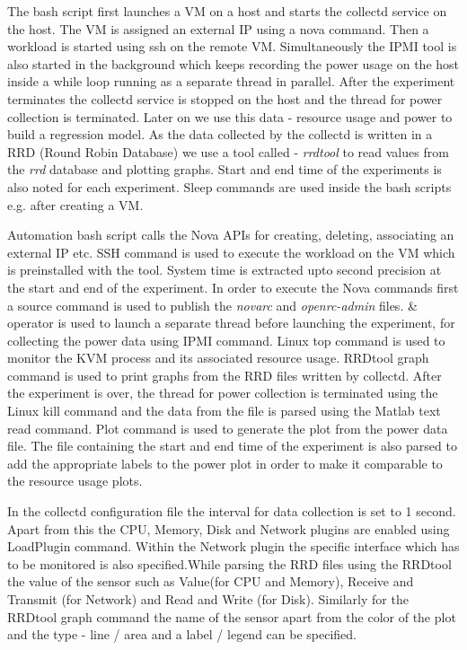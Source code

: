 \documentclass[singlecolumn,letterpaper,12pt]{article}
\begin{document}
The bash script first launches a VM on a host and starts the collectd service on the host. The VM is assigned an external IP using a nova command. Then a workload is started using ssh on the remote VM. Simultaneously the IPMI tool is also started in the background which keeps recording the power usage on the host inside a while loop running as a separate thread in parallel. After the experiment terminates the collectd service is stopped on the host and the thread for power collection is terminated. Later on we use this data - resource usage and power to build a regression model. As the data collected by the collectd is written in a RRD (Round Robin Database) we use a tool called - \emph{rrdtool} to read values from the \emph{rrd} database and plotting graphs. Start and end time of the experiments is also noted for each experiment. Sleep commands are used inside the bash scripts e.g. after creating a VM.

Automation bash script calls the Nova APIs for creating, deleting, associating an external IP etc. SSH command is used to execute the workload on the VM which is preinstalled with the tool. System time is extracted upto second precision at the start and end of the experiment. In order to execute the Nova commands first a source command is used to publish the \emph{novarc} and \emph{openrc-admin} files. \& operator is used to launch a separate thread before launching the experiment, for collecting the power data using IPMI command. Linux top command is used to monitor the KVM process and its associated resource usage. RRDtool graph command is used to print graphs from the RRD files written by collectd. After the experiment is over, the thread for power collection is terminated using the Linux kill command and the data from the file is parsed using the Matlab text read command. Plot command is used to generate the plot from the power data file. The file containing the start and end time of the experiment is also parsed to add the appropriate labels to the power plot in order to make it comparable to the resource usage plots.

In the collectd configuration file the interval for data collection is set to 1 second. Apart from this the CPU, Memory, Disk and Network plugins are enabled using LoadPlugin command. Within the Network plugin the specific interface which has to be monitored is also specified.While parsing the RRD files using the RRDtool the value of the sensor such as Value(for CPU and Memory), Receive and Transmit (for Network) and Read and Write (for Disk). Similarly for the RRDtool graph command the name of the sensor apart from the color of the plot and the type - line / area and a label / legend can be specified.
\end{document}
